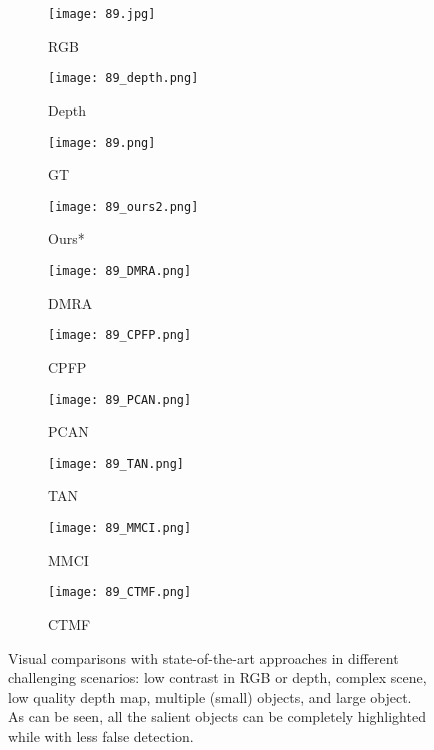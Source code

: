 \documentclass[runningheads]{llncs}
\begin{document}
\begin{figure}[t]
    \begin{subfigure}[t]{1.13cm}
		\centering
		\texttt{[image: 89.jpg]}
		\caption{\scriptsize RGB}
	\end{subfigure}
	\begin{subfigure}[t]{1.13cm}
		\centering
		\texttt{[image: 89\_depth.png]}
		\caption{\scriptsize Depth}
	\end{subfigure}
	\begin{subfigure}[t]{1.13cm}
		\centering
		\texttt{[image: 89.png]}
		\caption{\scriptsize GT}
	\end{subfigure}
	\begin{subfigure}[t]{1.13cm}
		\centering
		\texttt{[image: 89\_ours2.png]}
		\caption{\scriptsize Ours*}
	\end{subfigure}
	\begin{subfigure}[t]{1.13cm}
		\centering
		\texttt{[image: 89\_DMRA.png]}
		\caption{\scriptsize DMRA}
	\end{subfigure}
	\begin{subfigure}[t]{1.13cm}
		\centering
		\texttt{[image: 89\_CPFP.png]}
		\caption{\scriptsize CPFP}
	\end{subfigure}
	\begin{subfigure}[t]{1.13cm}
		\centering
		\texttt{[image: 89\_PCAN.png]}
		\caption{\scriptsize PCAN}
	\end{subfigure}
	\begin{subfigure}[t]{1.13cm}
		\centering
		\texttt{[image: 89\_TAN.png]}
		\caption{\scriptsize TAN}
	\end{subfigure}
	\begin{subfigure}[t]{1.13cm}
		\centering
		\texttt{[image: 89\_MMCI.png]}
		\caption{\scriptsize MMCI}
	\end{subfigure}
	\begin{subfigure}[t]{1.13cm}
		\centering
		\texttt{[image: 89\_CTMF.png]}
		\caption{\scriptsize CTMF}
	\end{subfigure}
	
	\caption{Visual comparisons with state-of-the-art approaches in different challenging scenarios: low contrast in RGB or depth, complex scene, low quality depth map, multiple (small) objects, and large object. As can be seen, all the salient objects can be completely highlighted while with less false detection.}\label{fig_smaps}
\end{figure}
\end{document}
